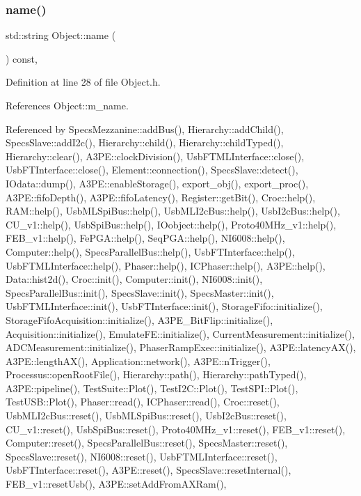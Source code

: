 \subsubsection{\texorpdfstring{name()}{name()}}
{\footnotesize\ttfamily std\+::string Object\+::name (\begin{DoxyParamCaption}{ }\end{DoxyParamCaption}) const\hspace{0.3cm}{\ttfamily [inline]}, {\ttfamily [inherited]}}



Definition at line 28 of file Object.\+h.



References Object\+::m\+\_\+name.



Referenced by Specs\+Mezzanine\+::add\+Bus(), Hierarchy\+::add\+Child(), Specs\+Slave\+::add\+I2c(), Hierarchy\+::child(), Hierarchy\+::child\+Typed(), Hierarchy\+::clear(), A3\+P\+E\+::clock\+Division(), Usb\+F\+T\+M\+L\+Interface\+::close(), Usb\+F\+T\+Interface\+::close(), Element\+::connection(), Specs\+Slave\+::detect(), I\+Odata\+::dump(), A3\+P\+E\+::enable\+Storage(), export\+\_\+obj(), export\+\_\+proc(), A3\+P\+E\+::fifo\+Depth(), A3\+P\+E\+::fifo\+Latency(), Register\+::get\+Bit(), Croc\+::help(), R\+A\+M\+::help(), Usb\+M\+L\+Spi\+Bus\+::help(), Usb\+M\+L\+I2c\+Bus\+::help(), Usb\+I2c\+Bus\+::help(), C\+U\+\_\+v1\+::help(), Usb\+Spi\+Bus\+::help(), I\+Oobject\+::help(), Proto40\+M\+Hz\+\_\+v1\+::help(), F\+E\+B\+\_\+v1\+::help(), Fe\+P\+G\+A\+::help(), Seq\+P\+G\+A\+::help(), N\+I6008\+::help(), Computer\+::help(), Specs\+Parallel\+Bus\+::help(), Usb\+F\+T\+Interface\+::help(), Usb\+F\+T\+M\+L\+Interface\+::help(), Phaser\+::help(), I\+C\+Phaser\+::help(), A3\+P\+E\+::help(), Data\+::hist2d(), Croc\+::init(), Computer\+::init(), N\+I6008\+::init(), Specs\+Parallel\+Bus\+::init(), Specs\+Slave\+::init(), Specs\+Master\+::init(), Usb\+F\+T\+M\+L\+Interface\+::init(), Usb\+F\+T\+Interface\+::init(), Storage\+Fifo\+::initialize(), Storage\+Fifo\+Acquisition\+::initialize(), A3\+P\+E\+\_\+\+Bit\+Flip\+::initialize(), Acquisition\+::initialize(), Emulate\+F\+E\+::initialize(), Current\+Measurement\+::initialize(), A\+D\+C\+Measurement\+::initialize(), Phaser\+Ramp\+Exec\+::initialize(), A3\+P\+E\+::latency\+A\+X(), A3\+P\+E\+::length\+A\+X(), Application\+::network(), A3\+P\+E\+::n\+Trigger(), Processus\+::open\+Root\+File(), Hierarchy\+::path(), Hierarchy\+::path\+Typed(), A3\+P\+E\+::pipeline(), Test\+Suite\+::\+Plot(), Test\+I2\+C\+::\+Plot(), Test\+S\+P\+I\+::\+Plot(), Test\+U\+S\+B\+::\+Plot(), Phaser\+::read(), I\+C\+Phaser\+::read(), Croc\+::reset(), Usb\+M\+L\+I2c\+Bus\+::reset(), Usb\+M\+L\+Spi\+Bus\+::reset(), Usb\+I2c\+Bus\+::reset(), C\+U\+\_\+v1\+::reset(), Usb\+Spi\+Bus\+::reset(), Proto40\+M\+Hz\+\_\+v1\+::reset(), F\+E\+B\+\_\+v1\+::reset(), Computer\+::reset(), Specs\+Parallel\+Bus\+::reset(), Specs\+Master\+::reset(), Specs\+Slave\+::reset(), N\+I6008\+::reset(), Usb\+F\+T\+M\+L\+Interface\+::reset(), Usb\+F\+T\+Interface\+::reset(), A3\+P\+E\+::reset(), Specs\+Slave\+::reset\+Internal(), F\+E\+B\+\_\+v1\+::reset\+Usb(), A3\+P\+E\+::set\+Add\+From\+A\+X\+Ram(), 